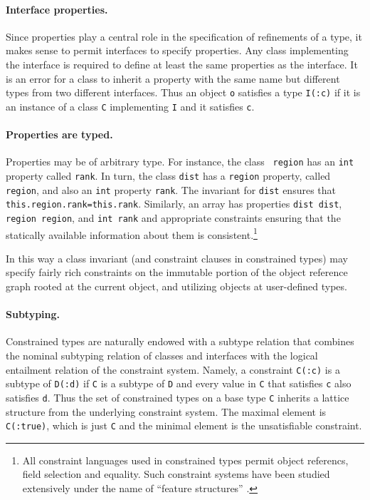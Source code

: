 \paragraph{Interface properties.}
Since properties play a central role in the specification of
refinements of a type, it makes sense to permit interfaces to specify
properties. Any class implementing the interface is required to define
at least the same properties as the interface. It is an error for a
class to inherit a property with the same name but different types
from two different interfaces.  Thus an object {\tt o} satisfies a
type {\tt I(:c)} if it is an instance of a class {\tt C} implementing
{\tt I} and it satisfies {\tt c}.

\paragraph{Properties are typed.}
Properties may be of arbitrary type. For instance, the class {\tt
region} has an {\tt int} property called {\tt rank}. In turn, the
class {\tt dist} has a {\tt region} property, called {\tt region}, and
also an {\tt int} property {\tt rank}.  The invariant for {\tt dist}
ensures that {\tt this.region.rank=this.rank}. Similarly, an array has
properties {\tt dist dist}, {\tt region region}, and {\tt int rank}
and appropriate constraints ensuring that the statically available
information about them is consistent.\footnote{All constraint
languages used in constrained types permit object referencs, field
selection and equality. Such constraint systems have been studied
extensively under the name of ``feature structures''
\cite{feature-structures}.}

In this way a class invariant (and constraint clauses in constrained
types) may specify fairly rich constraints on the immutable portion of
the object reference graph rooted at the current object, and utilizing
objects at user-defined types.

\paragraph{Subtyping.} 
Constrained types are naturally endowed with a subtype relation that
combines the nominal subtyping relation of classes and interfaces with
the logical entailment relation of the constraint system. Namely, a
constraint {\tt C(:c)} is a subtype of {\tt D(:d)} if {\tt C} is a
subtype of {\tt D} and every value in {\tt C} that satisfies {\tt c}
also satisfies {\tt d}. Thus the set of constrained types on a base
type {\tt C} inherits a lattice structure from the underlying
constraint system. The maximal element is {\tt C(:true)}, which is
just {\tt C} and the minimal element is the unsatisfiable constraint.

